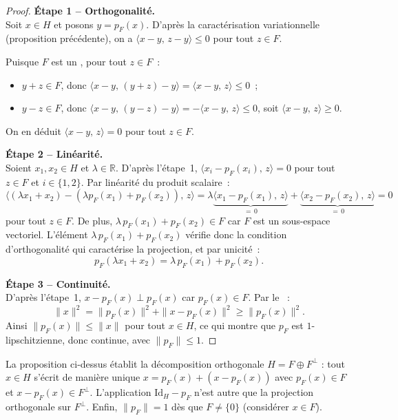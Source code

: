 \documentclass[11pt,a4paper]{article}
\begin{document}
\begin{proof}
\noindent
\textbf{Étape 1 -- Orthogonalité.}\\
Soit $x \in H$ et posons $y = p_F(x)$. D'après la caractérisation variationnelle
(proposition précédente), on a $\langle x - y, \, z - y\rangle \leq 0$ pour tout $z \in F$.

Puisque $F$ est un , pour tout $z \in F$~:
\begin{itemize}
\item $y + z \in F$, donc $\langle x - y, \, (y + z) - y\rangle = \langle x - y, \, z\rangle \leq 0$~;
\item $y - z \in F$, donc $\langle x - y, \, (y - z) - y\rangle = -\langle x - y, \, z\rangle \leq 0$,
soit $\langle x - y, \, z\rangle \geq 0$.
\end{itemize}
On en déduit $\langle x - y, \, z\rangle = 0$ pour tout $z \in F$.

\medskip
\textbf{Étape 2 -- Linéarité.}\\
Soient $x_1, x_2 \in H$ et $\lambda \in \mathbb{R}$. D'après l'étape~1,
$\langle x_i - p_F(x_i), \, z\rangle = 0$ pour tout $z \in F$ et $i \in \{1, 2\}$.
Par linéarité du produit scalaire~:
\[
\langle (\lambda x_1 + x_2) - (\lambda p_F(x_1) + p_F(x_2)), \, z\rangle
= \lambda \underbrace{\langle x_1 - p_F(x_1), \, z\rangle}_{=\,0} + \underbrace{\langle x_2 - p_F(x_2), \, z\rangle}_{=\,0} = 0
\]
pour tout $z \in F$. De plus, $\lambda\, p_F(x_1) + p_F(x_2) \in F$ car $F$ est un
sous-espace vectoriel. L'élément $\lambda\, p_F(x_1) + p_F(x_2)$ vérifie donc
la condition d'orthogonalité qui caractérise la projection, et par unicité~:
\[
p_F(\lambda x_1 + x_2) = \lambda\, p_F(x_1) + p_F(x_2).
\]

\medskip
\textbf{Étape 3 -- Continuité.}\\
D'après l'étape~1, $x - p_F(x) \perp p_F(x)$ car $p_F(x) \in F$.
Par le ~:
\[
\|x\|^2 = \|p_F(x)\|^2 + \|x - p_F(x)\|^2 \geq \|p_F(x)\|^2.
\]
Ainsi $\|p_F(x)\| \leq \|x\|$ pour tout $x \in H$, ce qui montre que $p_F$ est
$1$-lipschitzienne, donc continue, avec $\|p_F\| \leq 1$.
\end{proof}

\begin{remark}
La proposition ci-dessus établit la décomposition orthogonale
$H = F \oplus F^\perp$ : tout $x \in H$ s'écrit de manière unique
$x = p_F(x) + (x - p_F(x))$ avec $p_F(x) \in F$ et $x - p_F(x) \in F^\perp$.
L'application $\mathrm{Id}_H - p_F$ n'est autre que la projection orthogonale
sur $F^\perp$. Enfin, $\|p_F\| = 1$ dès que $F \neq \{0\}$ (considérer $x \in F$).
\end{remark}
\end{document}
